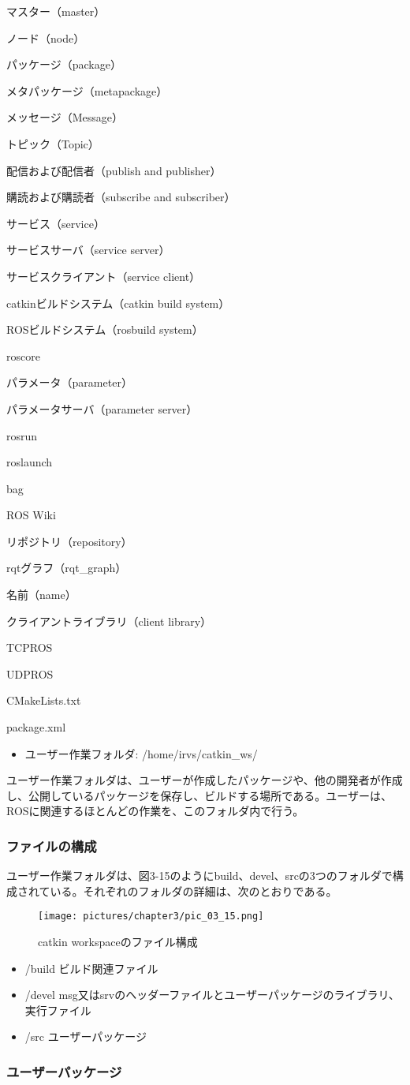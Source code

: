 \begin{term}{マスター（master）}
\begin{term}{ノード（node）}
\begin{term}{パッケージ（package）}
\begin{term}{メタパッケージ（metapackage）}
\begin{term}{メッセージ（Message）}
\begin{term}{トピック（Topic）}
\begin{term}{配信および配信者（publish and publisher）}
\begin{term}{購読および購読者（subscribe and subscriber）}
\begin{term}{サービス（service）}
\begin{term}{サービスサーバ（service server）}
\begin{term}{サービスクライアント（service client）}
\begin{term}{catkinビルドシステム（catkin build system）}
\begin{term}{ROSビルドシステム（rosbuild system）}
\begin{term}{roscore}
\begin{term}{パラメータ（parameter）}
\begin{term}{パラメータサーバ（parameter server）}
\begin{term}{rosrun}
\begin{term}{roslaunch}
\begin{term}{bag}
\begin{term}{ROS Wiki}
\begin{term}{リポジトリ（repository）}
\begin{term}{rqtグラフ（rqt\_graph）}
\begin{term}{名前（name）}
\begin{term}{クライアントライブラリ（client library）}
\begin{term}{TCPROS}
\begin{term}{UDPROS}
\begin{term}{CMakeLists.txt}
\begin{term}{package.xml}
\vspace{\baselineskip}
\begin{itemize}
\item ユーザー作業フォルダ: /home/irvs/catkin\_ws/
\end{itemize}
\vspace{\baselineskip}

ユーザー作業フォルダは、ユーザーが作成したパッケージや、他の開発者が作成し、公開しているパッケージを保存し、ビルドする場所である。ユーザーは、ROSに関連するほとんどの作業を、このフォルダ内で行う。

\subsubsection{ファイルの構成}
ユーザー作業フォルダは、図3-15のようにbuild、devel、srcの3つのフォルダで構成されている。それぞれのフォルダの詳細は、次のとおりである。

\begin{figure}[h]
  \centering
  \texttt{[image: pictures/chapter3/pic\_03\_15.png]}
  \caption{catkin workspaceのファイル構成}
\end{figure}

\vspace{\baselineskip}
\begin{itemize}
\item /build  ビルド関連ファイル
\item /devel  msg又はsrvのヘッダーファイルとユーザーパッケージのライブラリ、実行ファイル
\item /src    ユーザーパッケージ
\end{itemize}
\vspace{\baselineskip}

\subsubsection{ユーザーパッケージ}


\end{term}
\end{term}
\end{term}
\end{term}
\end{term}
\end{term}
\end{term}
\end{term}
\end{term}
\end{term}
\end{term}
\end{term}
\end{term}
\end{term}
\end{term}
\end{term}
\end{term}
\end{term}
\end{term}
\end{term}
\end{term}
\end{term}
\end{term}
\end{term}
\end{term}
\end{term}
\end{term}
\end{term}
